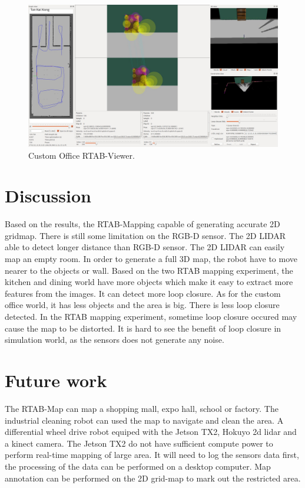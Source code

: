 \documentclass[10pt,journal,compsoc]{IEEEtran}
\begin{document}
\begin{figure}[thpb]
      \centering
      \includegraphics[width=\linewidth]{custom_office_loopclosure.png}
      \caption{Custom Office RTAB-Viewer.}
      \label{fig:robot10}
\end{figure}

\section{Discussion}
Based on the results, the RTAB-Mapping capable of generating accurate 2D gridmap. There is still some limitation on the RGB-D sensor. The 2D LIDAR able to detect longer distance than RGB-D sensor. The 2D LIDAR can easily map an empty room. In order to generate a full 3D map, the robot have to move nearer to the objects or wall.
Based on the two RTAB mapping experiment, the kitchen and dining world have more objects which make it easy to extract more features from the images. It can detect more loop closure. As for the custom office world, it has less objects and the area is big. There is less loop closure detected. In the RTAB mapping experiment, sometime loop closure occured may cause the map to be distorted. It is hard to see the benefit of loop closure in simulation world, as the sensors does not generate any noise.

\section{Future work}
The RTAB-Map can map a shopping mall, expo hall, school or factory. The industrial cleaning robot can used the map to navigate and clean the area. A differential wheel drive robot equiped with the Jetson TX2, Hokuyo 2d lidar and a kinect camera. The Jetson TX2 do not have sufficient compute power to perform real-time mapping of large area. It will need to log the sensors data first, the processing of the data can be performed on a desktop computer. Map annotation can be performed on the 2D grid-map to mark out the restricted area. 



\end{document}
